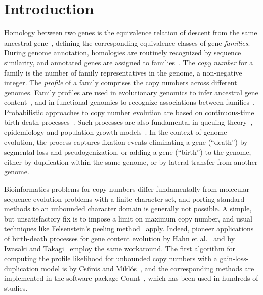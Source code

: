 \documentclass{elsarticle}
\begin{document}
\section{Introduction}
Homology between two genes is the
equivalence relation of descent from the same ancestral 
gene~\cite{Fitch.homology}, defining the corresponding equivalence classes 
of gene {\em families}. During genome annotation,  
homologies are routinely recognized by sequence similarity, and 
annotated genes are assigned to families~\cite{RAST}.
The {\em copy number} for a family is the number of family representatives
in the genome, a non-negative integer. The {\em profile} of a family comprises the 
copy numbers across different genomes. 
Family profiles are used in evolutionary genomics to 
infer ancestral gene content~\cite{phylobd.archaea}, 
and in functional genomics to recognize associations between families~\cite{DeyMeyer}. 
Probabilistic approaches to copy number evolution are based on 
continuous-time birth-death processes~\cite{Nye.genecontent}. 
Such processes are also fundamental in queuing theory~\cite{Takacs}, 
epidemiology and population growth models~\cite{Kendall}. 
In the context of genome evolution, 
the process captures fixation events eliminating a gene (``death'')
by segmental loss and pseudogenization, 
or adding a gene (``birth'') to the genome, either by duplication
within the same genome, or
by lateral transfer from another genome. 

Bioinformatics problems for 
copy numbers differ fundamentally from molecular sequence evolution 
problems with a finite character set, and    
porting standard methods to an unbounded character domain is 
generally not possible. 
A simple, but unsatisfactory fix   
is to impose a limit on maximum copy number, and usual 
techniques like Felsenstein's peeling 
method~\cite{Felsenstein.ML.pruning} apply. 
Indeed, 
pioneer applications of birth-death processes for 
gene content evolution by Hahn et al.~\cite{Hahn2005} and by
Iwasaki and Takagi~\cite{IwasakiTakagi} employ the same workaround. 
The first algorithm for computing the 
profile likelihood for unbounded copy numbers 
with a gain-loss-duplication model
is by 
Cs\H{u}r\"os and Mikl\'os~\cite{Istvan.genecontent,phylobd.archaea}, and  
the corresponding methods are implemented in the software package 
Count~\cite{Count}, which has been used in hundreds of studies.
\end{document}
